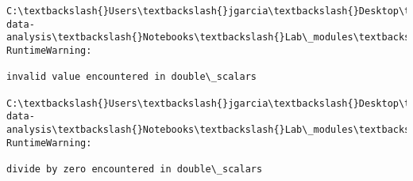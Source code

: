\documentclass[11pt]{article}
\begin{document}
    \begin{Verbatim}[commandchars=\\\{\}]
C:\textbackslash{}Users\textbackslash{}jgarcia\textbackslash{}Desktop\textbackslash{}Jupyter\_stuff\textbackslash{}Genetic-data-analysis\textbackslash{}Notebooks\textbackslash{}Lab\_modules\textbackslash{}StructE\_tools.py:377: RuntimeWarning:

invalid value encountered in double\_scalars

C:\textbackslash{}Users\textbackslash{}jgarcia\textbackslash{}Desktop\textbackslash{}Jupyter\_stuff\textbackslash{}Genetic-data-analysis\textbackslash{}Notebooks\textbackslash{}Lab\_modules\textbackslash{}StructE\_tools.py:377: RuntimeWarning:

divide by zero encountered in double\_scalars


    \end{Verbatim}
\end{document}
